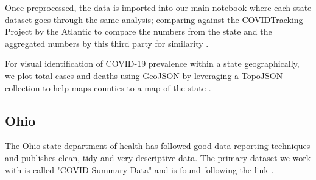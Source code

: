 \documentclass[conference]{IEEEtran}
\begin{document}
Once preprocessed, the data is imported into our main notebook where each state dataset goes through the same analysis; comparing against the COVIDTracking Project by the Atlantic to compare the numbers from the state and the aggregated numbers by this third party for similarity \cite{covid19tracking_covid_nodate}.

For visual identification of COVID-19 prevalence within a state geographically, we plot total cases and deaths using GeoJSON by leveraging a TopoJSON collection to help maps counties to a map of the state \cite{eldersveld_topojson_nodate}.

\subsection{Ohio}
\label{Ohio}

The Ohio state department of health has followed good data reporting techniques and publishes clean, tidy and very descriptive data. The primary dataset we work with is called "COVID Summary Data" and is found following the link \cite{system_covid-19_nodate}.
\end{document}
